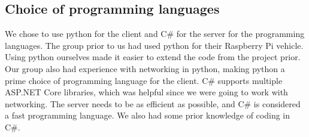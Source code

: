 \subsection{Choice of programming languages}
We chose to use python for the client and C\# for the server for the programming languages. The group prior to us had used python for their Raspberry Pi vehicle. Using python ourselves made it easier to extend the code from the project prior. Our group also had experience with networking in python, making python a prime choice of programming language for the client. C\# supports multiple ASP.NET Core libraries, which was helpful since we were going to work with networking. The server needs to be as efficient as possible, and C\# is considered a fast programming language. We also had some prior knowledge of coding in C\#.